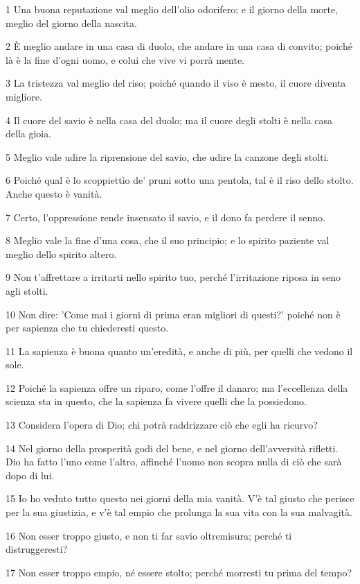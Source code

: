 \par 1 Una buona reputazione val meglio dell'olio odorifero; e il giorno della morte, meglio del giorno della nascita.
\par 2 È meglio andare in una casa di duolo, che andare in una casa di convito; poiché là è la fine d'ogni uomo, e colui che vive vi porrà mente.
\par 3 La tristezza val meglio del riso; poiché quando il viso è mesto, il cuore diventa migliore.
\par 4 Il cuore del savio è nella casa del duolo; ma il cuore degli stolti è nella casa della gioia.
\par 5 Meglio vale udire la riprensione del savio, che udire la canzone degli stolti.
\par 6 Poiché qual è lo scoppiettìo de' pruni sotto una pentola, tal è il riso dello stolto. Anche questo è vanità.
\par 7 Certo, l'oppressione rende insensato il savio, e il dono fa perdere il senno.
\par 8 Meglio vale la fine d'una cosa, che il suo principio; e lo spirito paziente val meglio dello spirito altero.
\par 9 Non t'affrettare a irritarti nello spirito tuo, perché l'irritazione riposa in seno agli stolti.
\par 10 Non dire: 'Come mai i giorni di prima eran migliori di questi?' poiché non è per sapienza che tu chiederesti questo.
\par 11 La sapienza è buona quanto un'eredità, e anche di più, per quelli che vedono il sole.
\par 12 Poiché la sapienza offre un riparo, come l'offre il danaro; ma l'eccellenza della scienza sta in questo, che la sapienza fa vivere quelli che la possiedono.
\par 13 Considera l'opera di Dio; chi potrà raddrizzare ciò che egli ha ricurvo?
\par 14 Nel giorno della prosperità godi del bene, e nel giorno dell'avversità rifletti. Dio ha fatto l'uno come l'altro, affinché l'uomo non scopra nulla di ciò che sarà dopo di lui.
\par 15 Io ho veduto tutto questo nei giorni della mia vanità. V'è tal giusto che perisce per la sua giustizia, e v'è tal empio che prolunga la sua vita con la sua malvagità.
\par 16 Non esser troppo giusto, e non ti far savio oltremisura; perché ti distruggeresti?
\par 17 Non esser troppo empio, né essere stolto; perché morresti tu prima del tempo?
